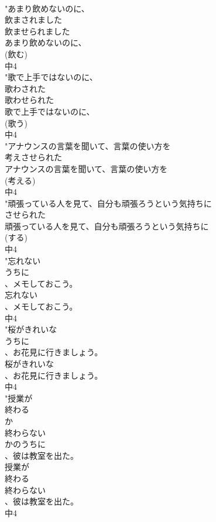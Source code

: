 \documentclass[8pt]{extreport}
\begin{document}
\begin{CJK}{UTF8}{min}
\\	"あまり飲めないのに、
\\	飲まされました
\\	飲ませられました
\\	あまり飲めないのに、
\\	(飲む)
\\	中4
\\	"歌で上手ではないのに、
\\	歌わされた
\\	歌わせられた
\\	歌で上手ではないのに、
\\	(歌う)
\\	中4
\\	"アナウンスの言葉を聞いて、言葉の使い方を
\\	考えさせられた
\\	アナウンスの言葉を聞いて、言葉の使い方を
\\	(考える)
\\	中4
\\	"頑張っている人を見て、自分も頑張ろうという気持ちに
\\	させられた
\\	頑張っている人を見て、自分も頑張ろうという気持ちに
\\	(する)
\\	中4
\\	"忘れない
\\	うちに
\\	、メモしておこう。
\\	忘れない
\\	、メモしておこう。
\\	中4
\\	"桜がきれいな
\\	うちに
\\	、お花見に行きましょう。
\\	桜がきれいな
\\	、お花見に行きましょう。
\\	中4
\\	"授業が
\\	終わる
\\	か
\\	終わらない
\\	かのうちに
\\	、彼は教室を出た。
\\	授業が
\\	終わる
\\	終わらない
\\	、彼は教室を出た。
\\	中4

\end{CJK}
\end{document}

